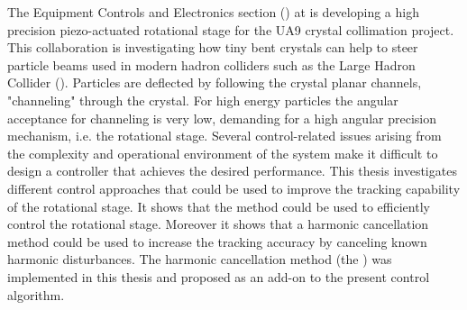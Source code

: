 The Equipment Controls and Electronics section (\abbrENSTIECE) at \abbrCERN is developing a high precision piezo-actuated rotational stage for the UA9 crystal collimation project. This collaboration is investigating how tiny bent crystals can help to steer particle beams used in modern hadron colliders such as the Large Hadron Collider (\abbrLHC). Particles are deflected by following the crystal planar channels, "channeling" through the crystal. For high energy particles the angular acceptance for channeling is very low, demanding for a high angular precision mechanism, i.e. the rotational stage. Several control-related issues arising from the complexity and operational environment of the system make it difficult to design a controller that achieves the desired performance. This thesis investigates different control approaches that could be used to improve the tracking capability of the rotational stage. It shows that the \abbrIRC method could be used to efficiently control the rotational stage. Moreover it shows that a harmonic cancellation method could be used to increase the tracking accuracy by canceling known harmonic disturbances. The harmonic cancellation method (the \abbrRFDC) was implemented in this thesis and proposed as an add-on to the present control algorithm.
